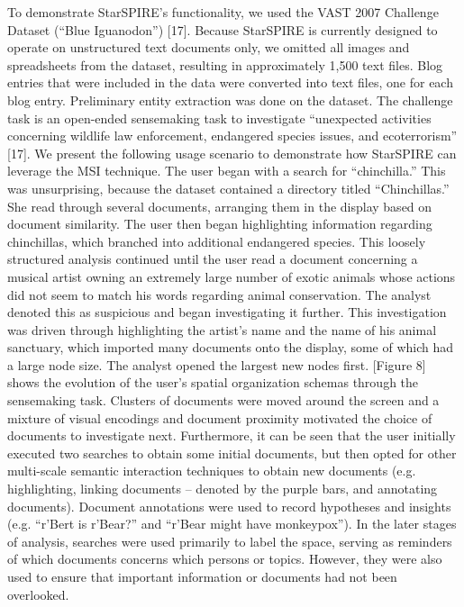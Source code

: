 \documentclass[journal]{vgtc}                %
\begin{document}
To demonstrate StarSPIRE’s functionality, we used the VAST 2007 Challenge Dataset (“Blue Iguanodon”) [17].
Because StarSPIRE is currently designed to operate on unstructured text documents only, we omitted all images and spreadsheets from the dataset, resulting in approximately 1,500 text files.
Blog entries that were included in the data were converted into text files, one for each blog entry.
Preliminary entity extraction was done on the dataset.
The challenge task is an open-ended sensemaking task to investigate “unexpected activities concerning wildlife law enforcement, endangered species issues, and ecoterrorism” [17].
We present the following usage scenario to demonstrate how StarSPIRE can leverage the MSI technique.
The user began with a search for “chinchilla.” This was unsurprising, because the dataset contained a directory titled “Chinchillas.”
She read through several documents, arranging them in the display based on document similarity.
The user then began highlighting information regarding chinchillas, which branched into additional endangered species.
This loosely structured analysis continued until the user read a document concerning a musical artist owning an extremely large number of exotic animals whose actions did not seem to match his words regarding animal conservation.
The analyst denoted this as suspicious and began investigating it further.
 This investigation was driven through highlighting the artist’s name and the name of his animal sanctuary, which imported many documents onto the display, some of which had a large node size.
  The analyst opened the largest new nodes first.
[Figure 8] shows the evolution of the user’s spatial organization schemas through the sensemaking task.
Clusters of documents were moved around the screen and a mixture of visual encodings and document proximity motivated the choice of documents to investigate next.
Furthermore, it can be seen that the user initially executed two searches to obtain some initial documents, but then opted for other multi-scale semantic interaction techniques to obtain new documents (e.g. highlighting, linking documents – denoted by the purple bars, and annotating documents).
Document annotations were used to record hypotheses and insights (e.g. “r’Bert is r’Bear?” and “r’Bear might have monkeypox”).
In the later stages of analysis, searches were used primarily to label the space, serving as reminders of which documents concerns which persons or topics.
However, they were also used to ensure that important information or documents had not been overlooked.
\end{document}
